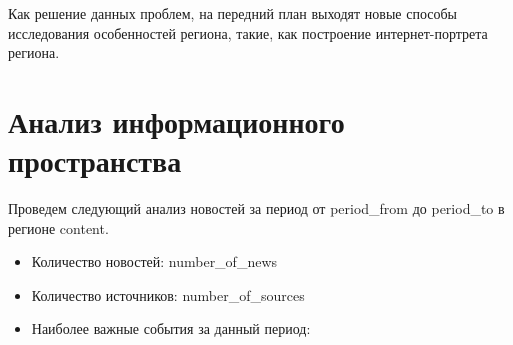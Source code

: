 \documentclass[a4paper,14pt]{extarticle}
\begin{document}
Как решение данных проблем, на передний план выходят новые способы исследования особенностей региона, такие, как построение интернет-портрета региона.

\chapter{Анализ информационного пространства}				

Проведем следующий анализ новостей за период от {{period_from}} до {{period_to}} в регионе {{content}}.
\begin{itemize}
	\item Количество новостей: {{number_of_news}}
	\item Количество источников: {{number_of_sources}}
	\item Наиболее важные события за данный период:
\end{itemize}
\end{document}
